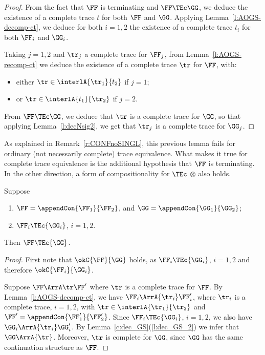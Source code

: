 \begin{proof}
  From the fact that $\FF$ is terminating and 
  $\FF \TEc \GG$, we deduce the existence of 
  a complete trace $t$ for both $\FF$ and $\GG$.
  Applying Lemma~\ref{l:AOGS-decomp-ct},
  we deduce for both $i=1,2$ the existence of a complete trace $t_i$
  for both $\FF_i$ and $\GG_i$. 
 
  Taking $j=1,2$ and $\tr_j$ a complete trace for $\FF_j$,
  from Lemma~\ref{l:AOGS-recomp-ct}
  we deduce the existence of a complete trace $\tr$ for $\FF$, with:
  \begin{itemize}
    \item either $\tr \in \interlA{\tr_1}{t_2}$ if $j=1$;
    \item or $\tr \in \interlA{t_1}{\tr_2}$ if $j=2$.
  \end{itemize}
  From $\FF  \TEc \GG$, we deduce that $\tr$ is a complete trace for $\GG$,
  so that applying Lemma~\ref{l:decNsig2},
  we get that $\tr_j$ is a complete trace for $\GG_j$.
\end{proof}
\noindent
As explained in Remark~\ref{r:CONFnoSINGL}, 
this previous lemma fails for ordinary (not necessarily complete) trace equivalence.
What makes it true for complete trace equivalence is the additional hypothesis
that $\FF$ is terminating.
%
In the other direction, a form of compositionality  
for $\TEc$ \wrt $\otimes$ also holds.

\begin{lemma}
\label{l:compCN}
Suppose 
\begin{enumerate}
\item 
$\FF = \appendCon{\FF_1}{\FF_2}$,   
 and  
$\GG = \appendCon{\GG_1}{\GG_2}$;
\item 
${\FF_i}  \TEc {\GG_i}$, $i=1,2$. 
\end{enumerate} 
Then 
${\FF} \TEc {\GG}$.
\end{lemma}              


\begin{proof}
First note that $\okC{\FF}{\GG}$ holds, 
as ${\FF_i}  \TEc {\GG_i}$, $i=1,2$ and therefore 
$\okC{{\FF_i}}{{\GG_i}}$. 

Suppose $\FF \ArrA \tr \FF'$ where $\tr$ is a complete trace for $\FF$. 
By Lemma~\ref{l:AOGS-decomp-ct}, we have 
${\FF_i} \ArrA{\tr_i} \FF_i'$,
where $ \tr_i$ is a complete trace, $i=1,2$,
with $\tr \in \interlA{\tr_1}{\tr_2} $ and  
$\FF' = \appendCon{\FF'_1}{\FF'_2}$.
%
Since ${\FF_i}  \TEc {\GG_i}$, $i=1,2$, we also have  
${\GG_i} \ArrA{\tr_i}   \GG_i'$. 
By Lemma~\ref{c:dec_GS}(\ref{l:dec_GS_2}) we infer that 
$\GG \ArrA{\tr}$. Moreover, $\tr$ is complete for $\GG$,
since $\GG$ has the same continuation structure as $\FF$.
\end{proof}  

